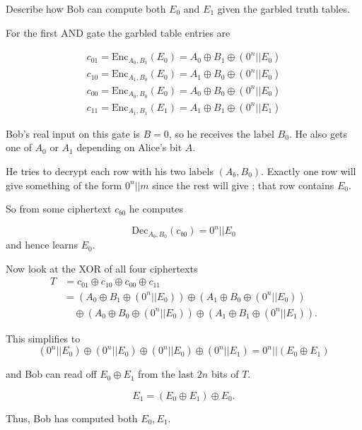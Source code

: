 \documentclass[12pt, letterpaper]{article}
\begin{document}
\begin{subproblem}{}
    Describe how Bob can compute both $E_0$ and $E_1$ given the garbled truth tables.
\end{subproblem}
\begin{problemproof}
    For the first AND gate the garbled table entries are

    \[
    \begin{array}{c}
    c_{01} = \text{Enc}_{A_0,B_1}(E_0) = A_0 \oplus B_1 \oplus (0^n || E_0)\\
    c_{10} = \text{Enc}_{A_1,B_0}(E_0) = A_1 \oplus B_0 \oplus (0^n || E_0)\\
    c_{00} = \text{Enc}_{A_0,B_0}(E_0) = A_0 \oplus B_0 \oplus (0^n || E_0)\\
    c_{11} = \text{Enc}_{A_1,B_1}(E_1) = A_1 \oplus B_1 \oplus (0^n || E_1)
    \end{array}
    \]

    Bob's real input on this gate is \(B=0\), so he receives the label \(B_0\).
    He also gets one of \(A_0\) or \(A_1\) depending on Alice's bit \(A\).

    He tries to decrypt each row with his two labels \((A_b,B_0)\).
    Exactly one row will give something of the form \(0^n||m\) since the rest will give ; that row contains \(E_0\).

    So from some ciphertext \(c_{b0}\) he computes

    \[
    \text{Dec}_{A_b,B_0}(c_{b0}) = 0^n || E_0
    \]
    and hence learns \(E_0\).

    Now look at the XOR of all four ciphertexts
    \[
    \begin{aligned}
    T &= c_{01} \oplus c_{10} \oplus c_{00} \oplus c_{11} \\
    &= (A_0 \oplus B_1 \oplus (0^n || E_0))
    \oplus (A_1 \oplus B_0 \oplus (0^n || E_0)) \\
    &\quad\oplus (A_0 \oplus B_0 \oplus (0^n || E_0))
    \oplus (A_1 \oplus B_1 \oplus (0^n || E_1)).
    \end{aligned}
    \]

    This simplifies to 
    \[
    (0^n||E_0) \oplus (0^n||E_0) \oplus (0^n||E_0) \oplus (0^n||E_1)
    = 0^n || (E_0 \oplus E_1)
    \]

    and Bob can read off \(E_0 \oplus E_1\) from the last \(2n\) bits of \(T\).

    \[
    E_1 = (E_0 \oplus E_1) \oplus E_0.
    \]

    Thus, Bob has computed both $E_0,E_1$.
\end{problemproof}
\end{document}
